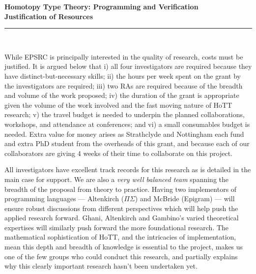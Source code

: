 \documentclass[a4paper,11pt]{article}
\begin{document}
\thispagestyle{plain}
\begin{center}
  {\Large \bf Homotopy Type Theory: Programming and Verification\\
\vspace{0.2in}
  Justification of Resources}\\[1ex]

\vspace*{-0.1in}

\rule{160mm}{.5mm}\\[2ex]
\end{center}

\noindent While EPSRC is principally interested in the quality of
research, costs must be justified. It is argued below that i) all four
investigators are required because they have
distinct-but-necessary skills; ii) the hours per week spent on
the grant by the investigators are required; iii)  two RAs are required because of the
breadth and volume of the work proposed; iv) the duration of the
grant is appropriate given the volume of the work involved and the
fast moving nature of HoTT research; v) the travel budget
is needed to underpin the planned collaborations, workshops, and
attendance at conferences; and vi) a small consumables budget is
needed. Extra value for money arises
as Strathclyde and Nottingham 
each fund and extra PhD student from the overheads of this grant, and
because each of our collaborators are giving 4 weeks of their time to
collaborate on this project.

\vspace{0.02in}

All investigators have excellent track records for this research as is
detailed in the main case for support.  We are also a {\em very well
  balanced team} spanning the breadth of the proposal from theory to
practice. Having two implementors of programming languages ---
Altenkirch ($\Pi\Sigma$) and McBride (Epigram) --- will ensure robust
discussions from different perspectives which will help push the
applied research forward. Ghani, Altenkirch and Gambino's varied
theoretical expertises will similarly push forward the more
foundational research. The mathematical sophistication of HoTT, and
the intricacies of implementation, mean this depth and breadth of
knowledge is essential to the project, makes us one of the few groups
who could conduct this research, and partially explains why this
clearly important research hasn't been undertaken yet.
\end{document}
